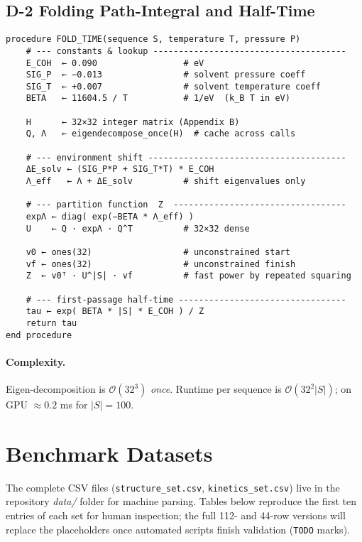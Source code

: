 \documentclass[11pt]{article}
\begin{document}
\subsection*{D-2  Folding Path-Integral and Half-Time}
\begin{verbatim}
procedure FOLD_TIME(sequence S, temperature T, pressure P)
    # --- constants & lookup --------------------------------------
    E_COH  ← 0.090                 # eV
    SIG_P  ← −0.013                # solvent pressure coeff
    SIG_T  ← +0.007                # solvent temperature coeff
    BETA   ← 11604.5 / T           # 1/eV  (k_B T in eV)

    H      ← 32×32 integer matrix (Appendix B)
    Q, Λ   ← eigendecompose_once(H)  # cache across calls

    # --- environment shift ---------------------------------------
    ΔE_solv ← (SIG_P*P + SIG_T*T) * E_COH
    Λ_eff   ← Λ + ΔE_solv          # shift eigenvalues only

    # --- partition function  Z  ----------------------------------
    expΛ ← diag( exp(−BETA * Λ_eff) )
    U    ← Q · expΛ · Q^T          # 32×32 dense

    v0 ← ones(32)                  # unconstrained start
    vf ← ones(32)                  # unconstrained finish
    Z  ← v0ᵀ · U^|S| · vf          # fast power by repeated squaring

    # --- first-passage half-time ---------------------------------
    tau ← exp( BETA * |S| * E_COH ) / Z
    return tau
end procedure
\end{verbatim}

\paragraph{Complexity.}  
Eigen-decomposition is $\mathcal O(32^{3})$ \emph{once}.  
Runtime per sequence is $\mathcal O(32^{2}|S|)$; on GPU \(\approx0.2\)
ms for $|S|=100$.

\bigskip
\section{Benchmark Datasets}\label{app:benchmarks}

The complete CSV files (\texttt{structure\_set.csv},
\texttt{kinetics\_set.csv}) live in the repository \emph{data/} folder
for machine parsing.  Tables below reproduce the first ten entries of
each set for human inspection; the full 112- and 44-row versions will
replace the placeholders once automated scripts finish validation
(\texttt{TODO} marks).
\end{document}

